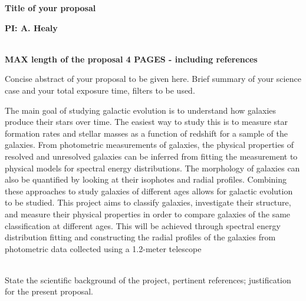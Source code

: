 \documentclass[11pt]{article}
\begin{document}
%
%
%
\centerline{\large{\bf
{Title of your proposal}}}  

\medskip
% 
\centerline{\bf PI: 
{A. Healy}}
 
\bigskip
%
\smallskip\\
\textbf{MAX length of the proposal 4 PAGES - including references}

Concise abstract of your proposal to be given here. 
Brief summary of your science case and your total exposure time, filters to be used.

The main goal of studying galactic evolution is to understand how galaxies produce their stars over time.
The easiest way to study this is to measure star formation rates and stellar masses as a function of redshift
for a sample of the galaxies.
From photometric measurements of galaxies, the physical properties of resolved and unresolved galaxies can be
inferred from fitting the measurement to physical models for spectral energy distributions. The morphology of
galaxies can also be quantified by looking at their isophotes and radial profiles. Combining these approaches
to study galaxies of different ages allows for galactic evolution to be studied. This project aims to classify
galaxies, investigate their structure, and measure their physical properties in order to compare galaxies of the
same classification at different ages. This will be achieved through spectral energy distribution fitting and
constructing the radial profiles of the galaxies from photometric data collected using a 1.2-meter telescope


%
%
%
%

\smallskip
{}
\smallskip\\
State the scientific background of the project, pertinent references; justification for the present proposal.
\end{document}
